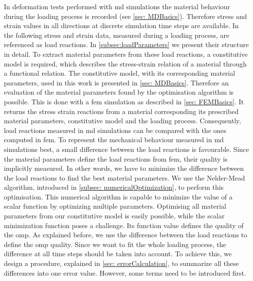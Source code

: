 In deformation tests performed with \acrshort{md} simulations the material behaviour during the loading process is recorded (see \autoref{sec: MDBasics}). Therefore stress and strain values in all directions at discrete simulation time steps are available. In the following stress and strain data, measured during a loading process, are referenced as load reactions. In \autoref{subsec:loadParameters} we present their structure in detail. To extract material parameters from these load reactions, a constitutive model is required, which describes the stress-strain relation of a material through a functional relation. The constitutive model, with its corresponding material parameters, used in this work is presented in \autoref{sec: MDBasics}. Therefore an evaluation of the material parameters found by the optimisation algorithm is possible. This is done with a \acrshort{fem} simulation as described in \autoref{sec: FEMBasics}. It returns the stress strain reactions from a material corresponding its prescribed material parameters, constitutive model and the loading process. Consequently, load reactions measured in \acrshort{md} simulations can be compared with the ones computed in \acrshort{fem}. To represent the mechanical behaviour measured in \acrshort{md} simulations best, a small difference between the load reactions is favourable. Since the material parameters define the load reactions from \acrshort{fem}, their quality is implicitly measured. In other words, we have to minimize the difference between the load reactions to find the best material parameters. We use the Nelder-Mead algorithm, introduced in \autoref{subsec: numericalOptimization}, to perform this optimisation. This numerical algorithm is capable to minimize the value of a scalar function by optimizing multiple parameters. Optimising all material parameters from our constitutive model is easily possible, while the scalar minimization function poses a challenge. Its function value defines the quality of the \acrlong{omp}. As explained before, we use the difference between the load reactions to define the \acrlong{omp} quality. Since we want to fit the whole loading process, the difference at all time steps should be taken into account. To achieve this, we design a procedure, explained in \autoref{sec: errorCalculation}, to summarize all these differences into one error value. However, some terms need to be introduced first. 


